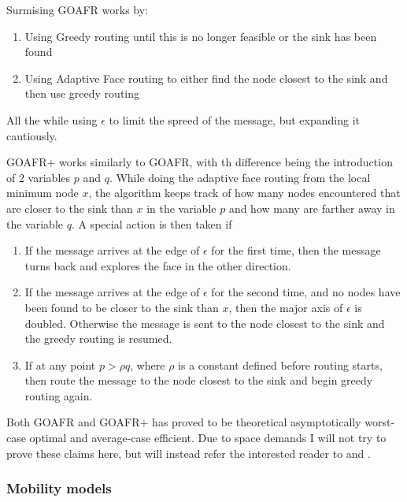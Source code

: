 Surmising GOAFR works by:
\begin{enumerate}
\item Using Greedy routing until this is no longer feasible or the sink has been found
\item Using Adaptive Face routing to either find the node closest to the sink and then use greedy routing
\end{enumerate}
All the while using $\epsilon$ to limit the spreed of the message, but expanding it cautiously.

GOAFR+ works similarly to GOAFR, with th difference being the introduction of 2 variables $p$ and $q$. While doing the adaptive face routing from the local minimum node $x$, the algorithm keeps track of how many nodes encountered that are closer to the sink than $x$ in the variable $p$ and how many are farther away in the variable $q$.
A special action is then taken if
\begin{enumerate}
\item If the message arrives at the edge of $\epsilon$ for the first time, then the message turns back and explores the face in the other direction. 
\item If the message arrives at the edge of $\epsilon$ for the second time, and no nodes have been found to be closer to the sink than $x$, then the major axis of $\epsilon$ is doubled. Otherwise the message is sent to the node closest to the sink and the greedy routing is resumed.
\item If at any point $p > \rho q$, where $\rho$ is a constant defined before routing starts, then route the message to the node closest to the sink and begin greedy routing again.
\end{enumerate}

Both GOAFR and GOAFR+ has proved to be theoretical asymptotically worst-case optimal and average-case efficient. Due to space demands I will not try to prove these claims here, but will instead refer the interested reader to \cite{gopher+} and \cite{gopher}.

\subsubsection{Mobility models}
